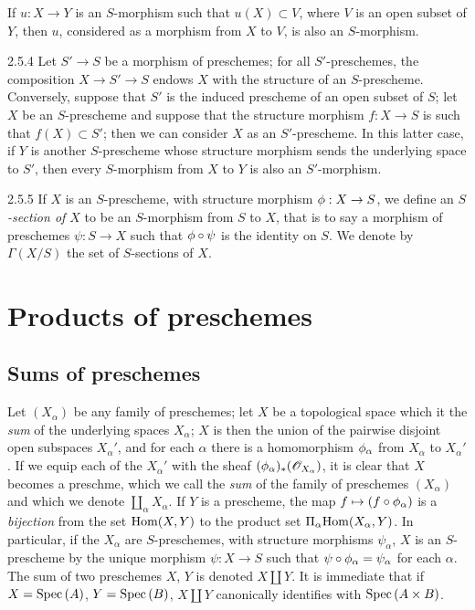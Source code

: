 If $u:X\to Y$ is an $S$-morphism such that $u(X)\subset V$, where $V$ is
an open subset of $Y$, then $u$, considered as a morphism from $X$ to $V$, is
also an $S$-morphism.

\begin{env}{2.5.4}
\label{env-1.2.5.4}
Let $S'\to S$ be a morphism of preschemes; for all
$S'$-preschemes, the composition $X\to S'\to S$ endows $X$ with the structure of
an $S$-prescheme. Conversely, suppose that $S'$ is the induced prescheme of an
open subset of $S$; let $X$ be an $S$-prescheme and suppose that the structure
morphism $f:X\to S$ is such that $f(X)\subset S'$; then we can consider
$X$ as an $S'$-prescheme. In this latter case, if $Y$ is another $S$-prescheme
whose structure morphism sends the underlying space to $S'$, then every
$S$-morphism from $X$ to $Y$ is also an $S'$-morphism.
\end{env}

\begin{env}{2.5.5}
\label{env-1.2.5.5}
If $X$ is an $S$-prescheme, with structure morphism
$\phi:X\to S$, we define an \emph{$S$-section of $X$} to be an
$S$-morphism from $S$ to $X$, that is to say a morphism of preschemes
$\psi:S\to X$ such that $\phi\circ\psi$ is the identity on $S$. We
denote by $\Gamma(X/S)$ the set of $S$-sections of $X$.
\end{env}

\section{Products of preschemes}
\label{1-schemes-3}

\subsection{Sums of preschemes}
\label{1-schemes-3.1}

Let $(X_\alpha)$ be any family of preschemes; let $X$ be a topological space which it the
\emph{sum} of the underlying spaces $X_\alpha$; $X$ is then the union of the pairwise
disjoint open subspaces $X_\alpha'$, and for each $\alpha$ there is a homomorphism
$\phi_\alpha$ from $X_\alpha$ to $X_\alpha'$. If we equip each of the $X_\alpha'$ with the
sheaf $(\phi_\alpha)_*(\mathscr{O}_{X_\alpha})$, it is clear that $X$ becomes a preschme, which
we call the \emph{sum} of the family of preschemes $(X_\alpha)$ and which we denote
$\amalg_\alpha X_\alpha$. If $Y$ is a prescheme, the map $f\mapsto(f\circ\phi_\alpha)$ is a
\emph{bijection} from the set ${\mathop{\mathrm{Hom}}\nolimits}(X,Y)$ to the product set $\Pi_\alpha{\mathop{\mathrm{Hom}}\nolimits}(X_\alpha,Y)$.
In particular, if the $X_\alpha$ are $S$-preschemes, with structure morphisms $\psi_\alpha$,
$X$ is an $S$-prescheme by the unique morphism $\psi:X\to S$ such that
$\psi\circ\phi_\alpha=\psi_\alpha$ for each $\alpha$. The sum of two preschemes $X$, $Y$ is
denoted $X\amalg Y$. It is immediate that if $X={\mathop{\mathrm{Spec}}\nolimits}\,(A)$, $Y={\mathop{\mathrm{Spec}}\nolimits}\,(B)$, $X\amalg Y$
canonically identifies with ${\mathop{\mathrm{Spec}}\nolimits}\,(A\times B)$.


